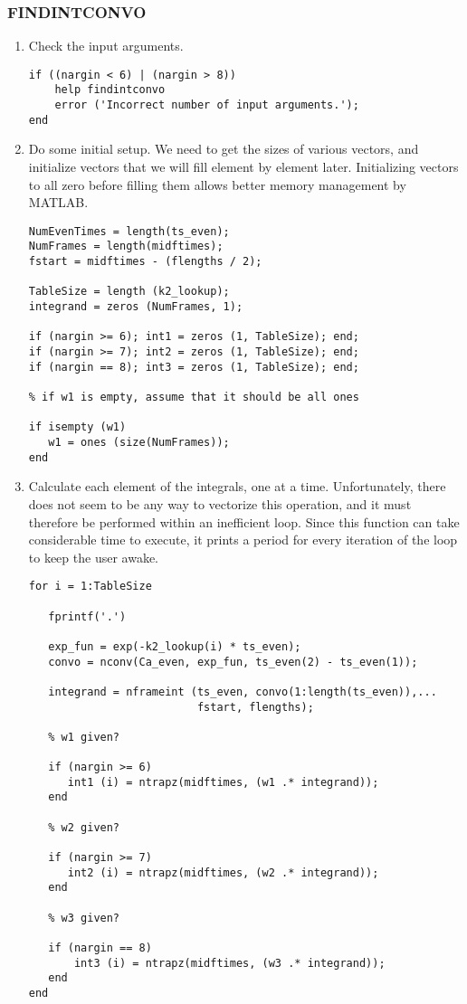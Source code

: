 \subsubsection{FINDINTCONVO}
\begin{enumerate}
\item Check the input arguments.
\begin{verbatim}
if ((nargin < 6) | (nargin > 8))
    help findintconvo
    error ('Incorrect number of input arguments.');
end
\end{verbatim}

\item Do some initial setup.  We need to get the sizes of various
vectors, and initialize vectors that we will fill element by element
later.  Initializing vectors to all zero before filling them allows
better memory management by MATLAB.
\begin{verbatim}
NumEvenTimes = length(ts_even);
NumFrames = length(midftimes);
fstart = midftimes - (flengths / 2);

TableSize = length (k2_lookup);
integrand = zeros (NumFrames, 1);

if (nargin >= 6); int1 = zeros (1, TableSize); end;
if (nargin >= 7); int2 = zeros (1, TableSize); end;
if (nargin == 8); int3 = zeros (1, TableSize); end;

% if w1 is empty, assume that it should be all ones

if isempty (w1)
   w1 = ones (size(NumFrames));
end
\end{verbatim}

\item Calculate each element of the integrals, one at a time.
Unfortunately, there does not seem to be any way to vectorize this
operation, and it must therefore be performed within an inefficient
 loop.  Since this function can take considerable time to
execute, it prints a period for every iteration of the loop to keep
the user awake.

\begin{verbatim}
for i = 1:TableSize

   fprintf('.')

   exp_fun = exp(-k2_lookup(i) * ts_even);
   convo = nconv(Ca_even, exp_fun, ts_even(2) - ts_even(1));

   integrand = nframeint (ts_even, convo(1:length(ts_even)),...
                          fstart, flengths);

   % w1 given?

   if (nargin >= 6)
      int1 (i) = ntrapz(midftimes, (w1 .* integrand));
   end
   
   % w2 given?

   if (nargin >= 7)
      int2 (i) = ntrapz(midftimes, (w2 .* integrand));
   end

   % w3 given?
   
   if (nargin == 8)
       int3 (i) = ntrapz(midftimes, (w3 .* integrand));
   end
end
\end{verbatim}
\end{enumerate}


